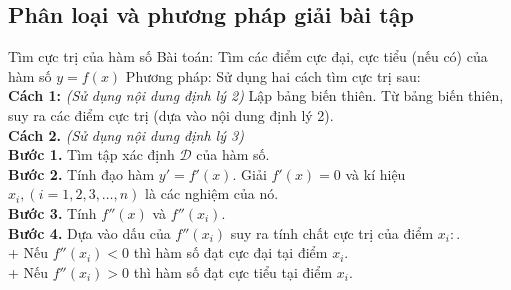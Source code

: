 \subsection{Phân loại và phương pháp giải bài tập}
\begin{dang}{Tìm cực trị của hàm số}
Bài toán: Tìm các điểm cực đại, cực tiểu (nếu có) của hàm số $y=f(x)$
	Phương pháp: Sử dụng hai cách tìm cực trị sau:\\
	\textbf{Cách 1:} \textit{(Sử dụng nội dung định lý 2)} Lập bảng biến thiên. Từ bảng biến thiên, suy ra các điểm cực trị (dựa vào nội dung định lý 2).\\
	\textbf{Cách 2.} \textit{(Sử dụng nội dung định lý 3)}\\ 
	\textbf{Bước 1.} Tìm tập xác định $\mathscr{D}$ của hàm số.\\
	\textbf{Bước 2.} Tính đạo hàm $y'=f'(x)$. Giải $f'(x)=0$ và kí hiệu $x_i, (i=1, 2, 3,\ldots,n)$ là các nghiệm của nó.\\
	\textbf{Bước 3.} Tính $f''(x)$ và $f''(x_i)$.\\
	\textbf{Bước 4.} Dựa vào dấu của $f''(x_i)$ suy ra tính chất cực trị của điểm $x_i\colon$.\\
	+ Nếu $f''(x_i)<0$ thì hàm số đạt cực đại tại điểm $x_i$.\\
	+ Nếu $f''(x_i)>0$ thì hàm số đạt cực tiểu tại điểm $x_i$.
\end{dang}
